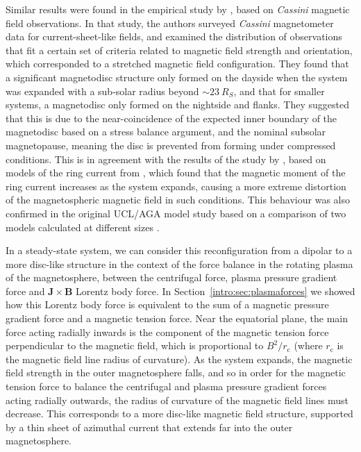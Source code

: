 Similar results were found in the empirical study by \citet{arridge2008}, based on \textit{Cassini} magnetic field observations. In that study, the authors surveyed \textit{Cassini} magnetometer data for current-sheet-like fields, and examined the distribution of observations that fit a certain set of criteria related to magnetic field strength and orientation, which corresponded to a stretched magnetic field configuration. They found that a significant magnetodisc structure only formed on the dayside when the system was expanded with a sub-solar radius beyond ${\sim}\SI{23}{R_S}$, and that for smaller systems, a magnetodisc only formed on the nightside and flanks. They suggested that this is due to the near-coincidence of the expected inner boundary of the magnetodisc based on a stress balance argument, and the nominal subsolar magnetopause, meaning the disc is prevented from forming under compressed conditions. This is in agreement with the results of the study by \citet{bunce2008}, based on models of the ring current from \citet{bunce2007}, which found that the magnetic moment of the ring current increases as the system expands, causing a more extreme distortion of the magnetospheric magnetic field in such conditions. This behaviour was also confirmed in the original UCL/AGA model study based on a comparison of two models calculated at different sizes \citep{achilleos2010a}.

In a steady-state system, we can consider this reconfiguration from a dipolar to a more disc-like structure in the context of the force balance in the rotating plasma of the magnetosphere, between the centrifugal force, plasma pressure gradient force and $\boldsymbol{J}\times\boldsymbol{B}$ Lorentz body force. In Section~\ref{intro:sec:plasmaforces} we showed how this Lorentz body force is equivalent to the sum of a magnetic pressure gradient force and a magnetic tension force. Near the equatorial plane, the main force acting radially inwards is the component of the magnetic tension force perpendicular to the magnetic field, which is proportional to $B^2/r_\mathrm{c}$ (where $r_\mathrm{c}$ is the magnetic field line radius of curvature). As the system expands, the magnetic field strength in the outer magnetosphere falls, and so in order for the magnetic tension force to balance the centrifugal and plasma pressure gradient forces acting radially outwards, the radius of curvature of the magnetic field lines must decrease. This corresponds to a more disc-like magnetic field structure, supported by a thin sheet of azimuthal current that extends far into the outer magnetosphere. 

